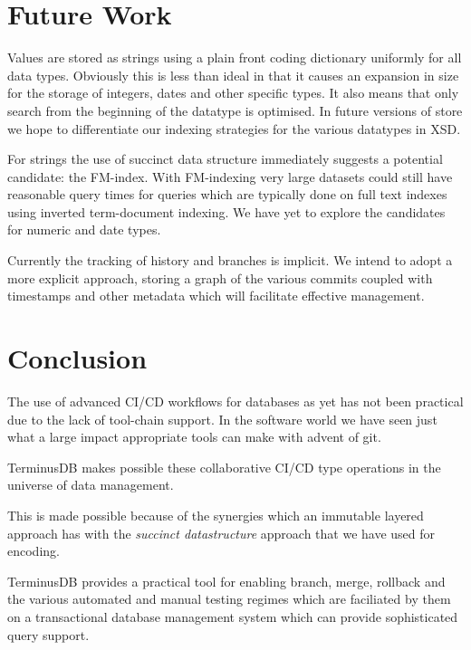 \documentclass[10pt, a4paper, twocolumn]{article} %
\begin{document}
\section{Future Work}

Values are stored as strings using a plain front coding dictionary
uniformly for all data types. Obviously this is less than ideal in
that it causes an expansion in size for the storage of integers, dates
and other specific types. It also means that only search from the
beginning of the datatype is optimised. In future versions of store we
hope to differentiate our indexing strategies for the various
datatypes in XSD.

For strings the use of succinct data structure immediately suggests a
potential candidate: the
FM-index\cite{Ferragina:2005:ICT:1082036.1082039}. With FM-indexing
very large datasets could still have reasonable query times for
queries which are typically done on full text indexes using inverted
term-document indexing. We have yet to explore the candidates for
numeric and date types.

Currently the tracking of history and branches is implicit. We intend
to adopt a more explicit approach, storing a graph of the various
commits coupled with timestamps and other metadata which will
facilitate effective management.

\section{Conclusion}

The use of advanced CI/CD workflows for databases as yet has not been
practical due to the lack of tool-chain support. In the software world
we have seen just what a large impact appropriate tools can make with
advent of git.

TerminusDB makes possible these collaborative CI/CD type operations in
the universe of data management.

This is made possible because of the synergies which an immutable
layered approach has with the {\em succinct datastructure} approach
that we have used for encoding.

TerminusDB provides a practical tool for enabling branch, merge,
rollback and the various automated and manual testing regimes which
are faciliated by them on a transactional database management system
which can provide sophisticated query support.

\printbibliography[title={Bibliography}]
\end{document}
